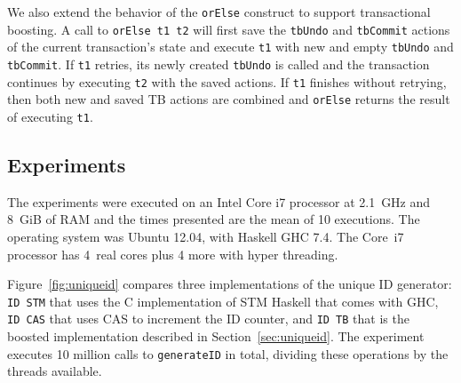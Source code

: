 \documentclass{llncs}
\begin{document}
We also extend the behavior of the {\tt orElse} construct to support transactional boosting.
A call to {\tt orElse t1 t2} will first save the {\tt tbUndo} and {\tt tbCommit} actions of
the current transaction's state and execute {\tt t1} with new and empty {\tt tbUndo} and {\tt tbCommit}.
If {\tt t1} retries, its newly created {\tt tbUndo} is called and the transaction continues by executing {\tt t2} with
the saved actions. If {\tt t1} finishes without retrying, then both new and saved TB actions are combined and {\tt orElse}
returns the result of executing {\tt t1}.

\subsection{Experiments}

The experiments were executed on an Intel Core i7 processor at 2.1~GHz and 8~GiB of RAM and the times
presented are the mean of 10 executions. The operating system was Ubuntu 12.04, with Haskell GHC 7.4. The Core~i7 processor has 4~real cores plus 4 more with hyper threading. 

Figure~\ref{fig:uniqueid} compares three implementations of the unique ID generator: {\tt ID STM} that uses the C implementation
of STM Haskell that comes with GHC, {\tt ID CAS} that uses CAS to increment the ID counter, and {\tt ID TB} that is the
boosted implementation described in Section~\ref{sec:uniqueid}. The experiment executes 10 million calls to {\tt generateID} in total, dividing
these operations by the threads available.
\end{document}
